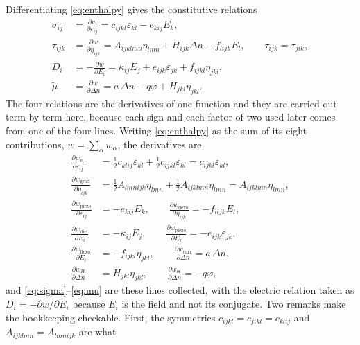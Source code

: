 Differentiating \eqref{eq:enthalpy} gives the constitutive relations
\begin{align}
\sigma_{ij}&=\frac{\partial w}{\partial\varepsilon_{ij}}
=c_{ijkl}\varepsilon_{kl}-e_{kij}E_k,
\label{eq:sigma}\\
\tau_{ijk}&=\frac{\partial w}{\partial\eta_{ijk}}
=A_{ijklmn}\eta_{lmn}+H_{ijk}\Delta n-f_{lijk}E_l,
\qquad \tau_{ijk}=\tau_{jik},
\label{eq:tau}\\
D_i&=-\frac{\partial w}{\partial E_i}
=\kappa_{ij}E_j+e_{ijk}\varepsilon_{jk}+f_{ijkl}\eta_{jkl},
\label{eq:D}\\
\widetilde\mu&=\frac{\partial w}{\partial\Delta n}
=a\,\Delta n-q\varphi+H_{jkl}\eta_{jkl}.
\label{eq:mu}
\end{align}
The four relations are the derivatives of one function and they are carried out term by term here, because each sign and each factor of two used later comes
from one of the four lines.  Writing \eqref{eq:enthalpy} as the sum of its eight
contributions, $w=\sum_\alpha w_\alpha$, the derivatives are
\begin{align}
\frac{\partial w_{\text{el}}}{\partial\varepsilon_{ij}}
&=\tfrac12 c_{klij}\varepsilon_{kl}+\tfrac12 c_{ijkl}\varepsilon_{kl}
=c_{ijkl}\varepsilon_{kl},\label{eq:diff_el}\\[2pt]
\frac{\partial w_{\text{grad}}}{\partial\eta_{ijk}}
&=\tfrac12 A_{lmnijk}\eta_{lmn}+\tfrac12 A_{ijklmn}\eta_{lmn}
=A_{ijklmn}\eta_{lmn},\\[2pt]
\frac{\partial w_{\text{piezo}}}{\partial\varepsilon_{ij}}&=-e_{kij}E_k,
\qquad
\frac{\partial w_{\text{flexo}}}{\partial\eta_{ijk}}=-f_{lijk}E_l,
\label{eq:diff_coup}\\[2pt]
\frac{\partial w_{\text{diel}}}{\partial E_i}&=-\kappa_{ij}E_j,
\qquad
\frac{\partial w_{\text{piezo}}}{\partial E_i}=-e_{ijk}\varepsilon_{jk},
\label{eq:diff_elec}\\[2pt]
\frac{\partial w_{\text{flexo}}}{\partial E_i}&=-f_{ijkl}\eta_{jkl},
\qquad
\frac{\partial w_{\text{carr}}}{\partial\Delta n}=a\,\Delta n,
\label{eq:diff_carr}\\[2pt]
\frac{\partial w_{H}}{\partial\Delta n}&=H_{jkl}\eta_{jkl},
\qquad
\frac{\partial w_{\text{es}}}{\partial\Delta n}=-q\varphi,
\label{eq:diff_es}
\end{align}
and \eqref{eq:sigma}--\eqref{eq:mu} are these lines collected, with the electric
relation taken as $D_i=-\partial w/\partial E_i$ because $E_i$ is the field and
not its conjugate.  Two remarks make the bookkeeping checkable.  First, the
symmetries $c_{ijkl}=c_{jikl}=c_{klij}$ and $A_{ijklmn}=A_{lmnijk}$ are what
